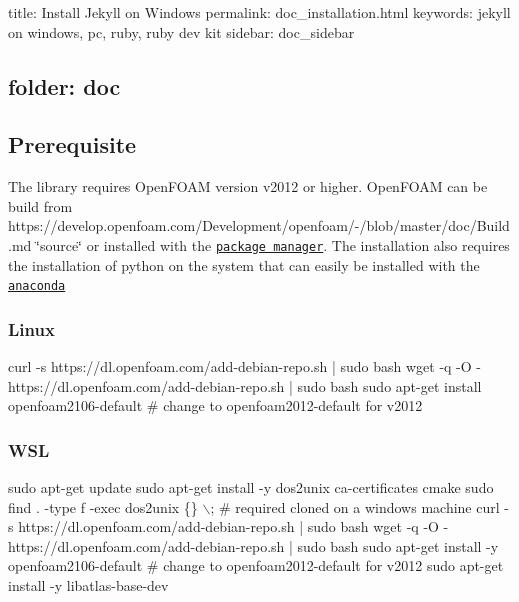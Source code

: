 

 title\+: Install Jekyll on Windows permalink\+: doc\+\_\+installation.\+html keywords\+: jekyll on windows, pc, ruby, ruby dev kit sidebar\+: doc\+\_\+sidebar \subsection*{folder\+: doc }

\subsection*{Prerequisite}

The library requires Open\+F\+O\+AM version v2012 or higher. Open\+F\+O\+AM can be build from https\+://develop.openfoam.\+com/\+Development/openfoam/-\//blob/master/doc/\+Build.md \char`\"{}source\char`\"{} or installed with the \href{https://develop.openfoam.com/Development/openfoam/-/wikis/precompiled}{\tt package manager}. The installation also requires the installation of python on the system that can easily be installed with the \href{https://www.anaconda.com/products/individual}{\tt anaconda}

\subsubsection*{Linux}


\begin{DoxyCode}
curl -s https://dl.openfoam.com/add-debian-repo.sh | sudo bash
wget -q -O - https://dl.openfoam.com/add-debian-repo.sh | sudo bash
sudo apt-get install openfoam2106-default # change to openfoam2012-default for v2012
\end{DoxyCode}


\subsubsection*{W\+SL}


\begin{DoxyCode}
sudo apt-get update
sudo apt-get install -y dos2unix ca-certificates cmake
sudo find . -type f -exec dos2unix \{\} \(\backslash\); # required cloned on a windows machine
curl -s https://dl.openfoam.com/add-debian-repo.sh | sudo bash
wget -q -O - https://dl.openfoam.com/add-debian-repo.sh | sudo bash
sudo apt-get install -y openfoam2106-default # change to openfoam2012-default for v2012
sudo apt-get install -y libatlas-base-dev
\end{DoxyCode}


